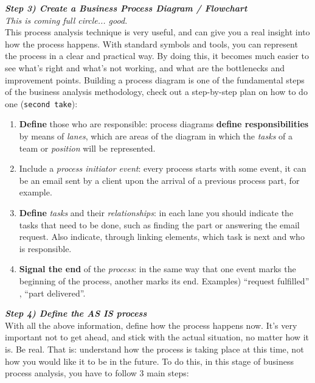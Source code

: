 \documentclass{article}
\begin{document}
{\vspace{0.3cm} 

\textbf{\textit{Step 3) Create a Business Process Diagram / Flowchart}} \\ 

\textit{This is coming full circle... good.} \\

This process analysis technique is very useful, and can give you a real insight into how the process happens. With standard symbols and tools, you can represent the process in a clear and practical way. By doing this, it becomes much easier to see what’s right and what’s not working, and what are the bottlenecks and improvement points. Building a process diagram is one of the fundamental steps of the business analysis methodology, check out a step-by-step plan on how to do one (\texttt{second take}): 

\begin{enumerate}
    \item \textbf{Define} those who are responsible: process diagrams \textbf{define responsibilities} by means of \textit{lanes}, which are areas of the diagram in which the \textit{tasks} of a team or \textit{position} will be represented. 
    \item Include a \textit{process initiator event}: every process starts with some event, it can be an email sent by a client upon the arrival of a previous process part, for example.
    \item \textbf{Define} \textit{tasks} and their \textit{relationships}: in each lane you should indicate the tasks that need to be done, such as finding the part or answering the email request. Also indicate, through linking elements, which task is next and who is responsible.
    \item \textbf{Signal the end} of the \textit{process}: in the same way that one event marks the beginning of the process, another marks its end. Examples) “request fulfilled” , “part delivered”.
\end{enumerate}

\vspace{0.3cm} 

\textbf{\textit{Step 4) Define the AS IS process}} \\

With all the above information, define how the process happens now. It’s very important not to get ahead, and stick with the actual situation, no matter how it is. Be real. That is: understand how the process is taking place at this time, not how you would like it to be in the future. To do this, in this stage of business process analysis, you have to follow 3 main steps: 

}
\end{document}
